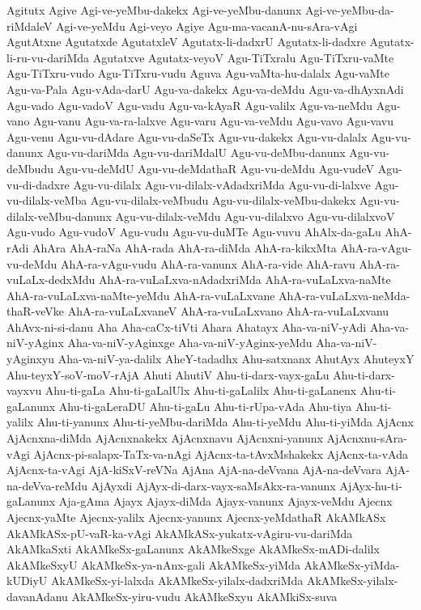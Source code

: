 {Agitutx
Agive
Agi-ve-yeMbu-dakekx
Agi-ve-yeMbu-danunx
Agi-ve-yeMbu-da-riMdaleV
Agi-ve-yeMdu
Agi-veyo
Agiye
Agu-ma-vacanA-nu-sAra-vAgi
AgutAtxne
Agutatxde
AgutatxleV
Agutatx-li-dadxrU
Agutatx-li-dadxre
Agutatx-li-ru-vu-dariMda
Agutatxve
Agutatx-veyoV
Agu-TiTxralu
Agu-TiTxru-vaMte
Agu-TiTxru-vudo
Agu-TiTxru-vudu
Aguva
Agu-vaMta-hu-dalalx
Agu-vaMte
Agu-va-Pala
Agu-vAda-darU
Agu-va-dakekx
Agu-va-deMdu
Agu-va-dhAyxnAdi
Agu-vado
Agu-vadoV
Agu-vadu
Agu-va-kAyaR
Agu-valilx
Agu-va-neMdu
Agu-vano
Agu-vanu
Agu-va-ra-lalxve
Agu-varu
Agu-va-veMdu
Agu-vavo
Agu-vavu
Agu-venu
Agu-vu-dAdare
Agu-vu-daSeTx
Agu-vu-dakekx
Agu-vu-dalalx
Agu-vu-danunx
Agu-vu-dariMda
Agu-vu-dariMdalU
Agu-vu-deMbu-danunx
Agu-vu-deMbudu
Agu-vu-deMdU
Agu-vu-deMdathaR
Agu-vu-deMdu
Agu-vudeV
Agu-vu-di-dadxre
Agu-vu-dilalx
Agu-vu-dilalx-vAdadxriMda
Agu-vu-di-lalxve
Agu-vu-dilalx-veMba
Agu-vu-dilalx-veMbudu
Agu-vu-dilalx-veMbu-dakekx
Agu-vu-dilalx-veMbu-danunx
Agu-vu-dilalx-veMdu
Agu-vu-dilalxvo
Agu-vu-dilalxvoV
Agu-vudo
Agu-vudoV
Agu-vudu
Agu-vu-duMTe
Agu-vuvu
AhAlx-da-gaLu
AhA-rAdi
AhAra
AhA-raNa
AhA-rada
AhA-ra-diMda
AhA-ra-kikxMta
AhA-ra-vAgu-vu-deMdu
AhA-ra-vAgu-vudu
AhA-ra-vanunx
AhA-ra-vide
AhA-ravu
AhA-ra-vuLaLx-dedxMdu
AhA-ra-vuLaLxva-nAdadxriMda
AhA-ra-vuLaLxva-naMte
AhA-ra-vuLaLxva-naMte-yeMdu
AhA-ra-vuLaLxvane
AhA-ra-vuLaLxva-neMda-thaR-veVke
AhA-ra-vuLaLxvaneV
AhA-ra-vuLaLxvano
AhA-ra-vuLaLxvanu
AhAvx-ni-si-danu
Aha
Aha-caCx-tiVti
Ahara
Ahatayx
Aha-va-niV-yAdi
Aha-va-niV-yAginx
Aha-va-niV-yAginxge
Aha-va-niV-yAginx-yeMdu
Aha-va-niV-yAginxyu
Aha-va-niV-ya-dalilx
AheY-tadadhx
Ahu-satxnanx
AhutAyx
AhuteyxY
Ahu-teyxY-soV-moV-rAjA
Ahuti
AhutiV
Ahu-ti-darx-vayx-gaLu
Ahu-ti-darx-vayxvu
Ahu-ti-gaLa
Ahu-ti-gaLalUlx
Ahu-ti-gaLalilx
Ahu-ti-gaLanenx
Ahu-ti-gaLanunx
Ahu-ti-gaLeraDU
Ahu-ti-gaLu
Ahu-ti-rUpa-vAda
Ahu-tiya
Ahu-ti-yalilx
Ahu-ti-yanunx
Ahu-ti-yeMbu-dariMda
Ahu-ti-yeMdu
Ahu-ti-yiMda
AjAcnx
AjAcnxna-diMda
AjAcnxnakekx
AjAcnxnavu
AjAcnxni-yanunx
AjAcnxnu-sAra-vAgi
AjAcnx-pi-salapx-TaTx-va-nAgi
AjAcnx-ta-tAvxMshakekx
AjAcnx-ta-vAda
AjAcnx-ta-vAgi
AjA-kiSxV-reVNa
AjAna
AjA-na-deVvana
AjA-na-deVvara
AjA-na-deVva-reMdu
AjAyxdi
AjAyx-di-darx-vayx-saMsAkx-ra-vanunx
AjAyx-hu-ti-gaLanunx
Aja-gAma
Ajayx
Ajayx-diMda
Ajayx-vanunx
Ajayx-veMdu
Ajecnx
Ajecnx-yaMte
Ajecnx-yalilx
Ajecnx-yanunx
Ajecnx-yeMdathaR
AkAMkASx
AkAMkASx-pU-vaR-ka-vAgi
AkAMkASx-yukatx-vAgiru-vu-dariMda
AkAMkaSxti
AkAMkeSx-gaLanunx
AkAMkeSxge
AkAMkeSx-mADi-dalilx
AkAMkeSxyU
AkAMkeSx-ya-nAnx-gali
AkAMkeSx-yiMda
AkAMkeSx-yiMda-kUDiyU
AkAMkeSx-yi-lalxda
AkAMkeSx-yilalx-dadxriMda
AkAMkeSx-yilalx-davanAdanu
AkAMkeSx-yiru-vudu
AkAMkeSxyu
AkAMkiSx-suva
}

